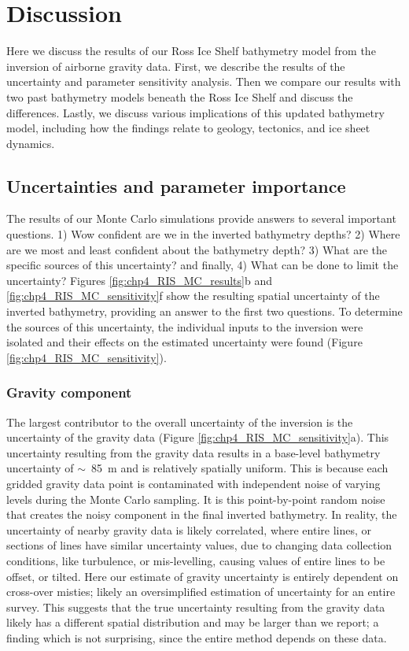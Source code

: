 \section{Discussion}

Here we discuss the results of our Ross Ice Shelf bathymetry model from the inversion of airborne gravity data. First, we describe the results of the uncertainty and parameter sensitivity analysis. Then we compare our results with two past bathymetry models beneath the Ross Ice Shelf and discuss the differences. Lastly, we discuss various implications of this updated bathymetry model, including how the findings relate to geology, tectonics, and ice sheet dynamics. %

\subsection{Uncertainties and parameter importance}

The results of our Monte Carlo simulations provide answers to several important questions. 1) Wow confident are we in the inverted bathymetry depths? 2) Where are we most and least confident about the bathymetry depth? 3) What are the specific sources of this uncertainty? and finally, 4) What can be done to limit the uncertainty? Figures \ref{fig:chp4_RIS_MC_results}b and \ref{fig:chp4_RIS_MC_sensitivity}f show the resulting spatial uncertainty of the inverted bathymetry, providing an answer to the first two questions. To determine the sources of this uncertainty, the individual inputs to the inversion were isolated and their effects on the estimated uncertainty were found (Figure \ref{fig:chp4_RIS_MC_sensitivity}).\\

\subsubsection{Gravity component}
 The largest contributor to the overall uncertainty of the inversion is the uncertainty of the gravity data (Figure \ref{fig:chp4_RIS_MC_sensitivity}a). This uncertainty resulting from the gravity data results in a base-level bathymetry uncertainty of $\sim$~85~m and is relatively spatially uniform. This is because each gridded gravity data point is contaminated with independent noise of varying levels during the Monte Carlo sampling. It is this point-by-point random noise that creates the noisy component in the final inverted bathymetry. In reality, the uncertainty of nearby gravity data is likely correlated, where entire lines, or sections of lines have similar uncertainty values, due to changing data collection conditions, like turbulence, or mis-levelling, causing values of entire lines to be offset, or tilted. Here our estimate of gravity uncertainty is entirely dependent on cross-over misties; likely an oversimplified estimation of uncertainty for an entire survey. This suggests that the true uncertainty resulting from the gravity data likely has a different spatial distribution and may be larger than we report; a finding which is not surprising, since the entire method depends on these data.\\ 

